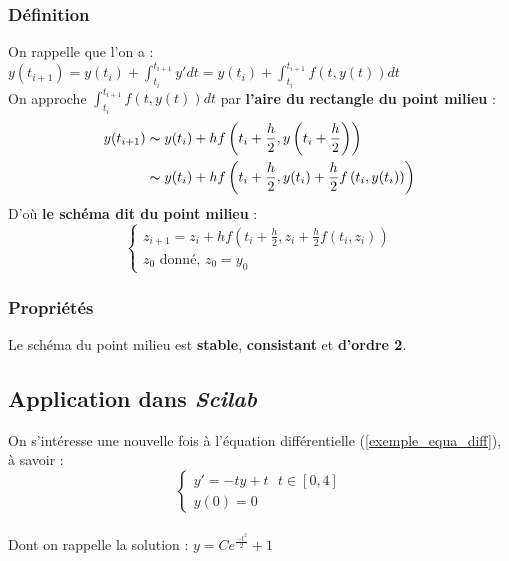 \documentclass[a4paper,10pt]{report}
\begin{document}
\subsubsection{Définition}
On rappelle que l'on a : $y(t_{i+1}) = y(t_i) + \int_{t_i}^{t_{i+1}} y'dt = y(t_i) + \int_{t_i}^{t_{i+1}} f(t,y(t))dt$\\
On approche $\int_{t_i}^{t_{i+1}} f(t,y(t))dt$ par \textbf{l'aire du rectangle du point milieu} :
\abovedisplayskip=0mm
\begin{align*}
   y(t_{i+1}) & \thicksim y(t_i)+hf\left( t_i+\frac{h}{2}, y\left(t_i+\frac{h}{2}\right)\right) \\
			  & \thicksim y(t_i)+hf\left( t_i+\frac{h}{2}, y(t_i)+\frac{h}{2}f\left(t_i,y(t_i)\right)\right)
\end{align*}
D'où \textbf{le schéma dit du point milieu} :
\begin{equation}
\left\lbrace
\begin{array}{l}
z_{i+1}=z_i+hf\left(t_i+\frac{h}{2},z_i+\frac{h}{2}f(t_i,z_i)\right) \\
z_0 \text{ donné, } z_0=y_0
\end{array}\right.
\end{equation}

\subsubsection{Propriétés}
Le schéma du point milieu est \textbf{stable}, \textbf{consistant} et \textbf{d'ordre 2}.

\subsection{Application dans \textit{Scilab}}
On s'intéresse une nouvelle fois à l'équation différentielle (\ref{exemple_equa_diff}), à savoir :\\
\begin{equation*}
\left\lbrace
\begin{array}{l}
y'=-ty+t \ \ \ t \in [0,4] \\
y(0)=0
\end{array}\right.
\end{equation*} \\
Dont on rappelle la solution : $y=Ce^{\frac{-t^2}{2}}+1$\\ \\
\end{document}
